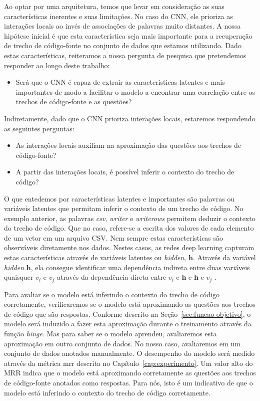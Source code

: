 Ao optar por uma arquitetura, temos que levar em consideração as suas características inerentes e suas limitações. No caso do CNN, ele prioriza as interações locais ao invés de associações de palavras muito distantes. A nossa hipótese inicial é que esta característica seja mais importante para a recuperação de trecho de código-fonte no conjunto de dados que estamos utilizando. Dado estas características, reiteramos a nossa pergunta de pesquisa que pretendemos responder ao longo deste trabalho:

\begin{itemize}
    \item Será que o CNN é capaz de extrair as características latentes e mais importantes de modo a facilitar o modelo a encontrar uma correlação entre os trechos de código-fonte e as questões?
\end{itemize}

Indiretamente, dado que o CNN prioriza interações locais, estaremos respondendo as seguintes perguntas:
\begin{itemize}
    
        \item As interações locais auxiliam na aproximação das questões aos trechos de código-fonte?
        \item A partir das interações locais, é possível inferir o contexto do trecho de código?
\end{itemize}



O que entedemos por características latentes e importantes são palavras ou variáveis latentes que permitam inferir o contexto de um trecho de código. No exemplo anterior, as palavras \emph{csv}, \emph{writer} e \emph{writerows} permitem deduzir o contexto do trecho de código. Que no caso, refere-se a escrita dos valores de cada elemento de um vetor em um arquivo CSV. Nem sempre estas características são observáveis diretamente nos dados. Nestes casos, as redes deep learning capturam estas características através de variáveis latentes ou \textit{hidden}, $\bm{h}$. Através da variável \textit{hidden} $\bm{h}$, ela consegue identificar uma dependência indireta entre duas variáveis quaisquer $v_{i}$ e $v_{j}$ através da dependência direta entre $v_{i}$ e $\bm{h}$ e $\bm{h}$ e $v_{j}$ \citep{Goodfellow-et-al-2016:structured-probabilistic-models-for-deep-learning}.

Para avaliar se o modelo está inferindo o contexto do trecho de código corretamente, verificaremos se o modelo está aproximando as questões aos trechos de código que são respostas. Conforme descrito na Seção~\ref{sec:funcao-objetivo}, o modelo será induzido a fazer esta aproximação durante o treinamento através da função \textit{hinge}. Mas para saber se o modelo aprendeu, avaliaremos esta aproximação em outro conjunto de dados. No nosso caso, avaliaremos em um conjunto de dados anotados manualmente. O desempenho do modelo será medido através da métrica \acrshort{mrr} descrita no Capítulo~\ref{cap:experimento}. Um valor alto do MRR indica que o modelo está aproximando corretamente as questões aos trechos de código-fonte anotados como respostas. Para nós, isto é um indicativo de que o modelo está inferindo o contexto do trecho de código corretamente.
